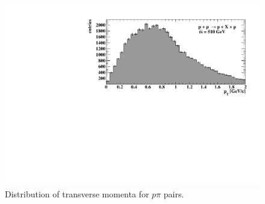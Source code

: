 \FloatBarrier
\begin{figure}[ht]
    \centering
    \includegraphics[width=1\textwidth]{figures/hPtMissingLambda.pdf}
    \caption[Distribution of transverse momenta for $p \pi$ pairs]{Distribution of transverse momenta for $p \pi$ pairs.}
    \label{af77}
\end{figure}
\FloatBarrier
